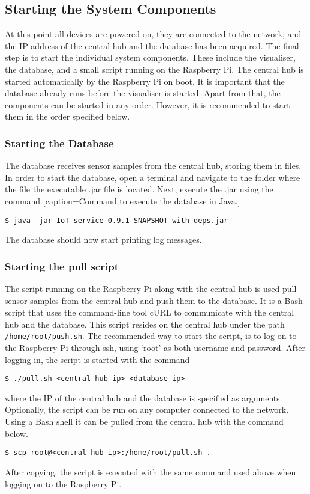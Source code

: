\documentclass[../document.tex]{subfiles}
\begin{document}
\subsection{Starting the System Components}
At this point all devices are powered on, they are connected to the network, and the IP address of the central hub and the database has been acquired. The final step is to start the individual system components. These include the visualiser, the database, and a small script running on the \gls{Raspberry Pi}. The central hub is started automatically by the \gls{Raspberry Pi} on boot. It is important that the database already runs before the visualiser is started. Apart from that, the components can be started in any order. However, it is recommended to start them in the order specified below.

\subsubsection{Starting the Database}
The database receives sensor samples from the central hub, storing them in files. In order to start the database, open a terminal and navigate to the folder where the file the executable .jar file is located. Next, execute the .jar using the command
\lstset{style=custombash}[caption=Command to execute the database in Java.]
\begin{lstlisting}
$ java -jar IoT-service-0.9.1-SNAPSHOT-with-deps.jar
\end{lstlisting}
The database should now start printing log messages.



\subsubsection{Starting the pull script}
The script running on the \gls{Raspberry Pi} along with the central hub is used pull sensor samples from the central hub and push them to the database. It is a Bash script that uses the command-line tool cURL to communicate with the central hub and the database. This script resides on the central hub under the path \texttt{/home/root/push.sh}. The recommended way to start the script, is to log on to the \gls{Raspberry Pi} through ssh, using ‘root’ as both username and password. After logging in, the script is started with the command
\lstset{style=custombash}
\begin{lstlisting}
$ ./pull.sh <central hub ip> <database ip>
\end{lstlisting}
where the IP of the central hub and the database is specified as arguments. Optionally, the script can be run on any computer connected to the network. Using a Bash shell it can be pulled from the central hub with the command below.
\lstset{style=custombash}
\begin{lstlisting}
$ scp root@<central hub ip>:/home/root/pull.sh .
\end{lstlisting}
After copying, the script is executed with the same command used above when logging on to the \gls{Raspberry Pi}.
\end{document}
